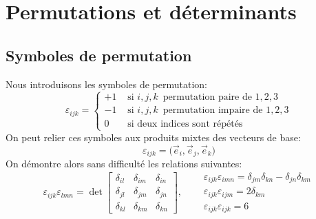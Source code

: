 \section{Permutations et déterminants}
\subsection{Symboles de permutation}
Nous introduisons les symboles de permutation:
\begin{equation}
    \varepsilon_{ijk} = 
    \begin{cases}
        +1 & \text{ si } i, j, k\, \text{ permutation paire de } 1, 2, 3\\
        -1 & \text{ si } i, j, k\, \text{ permutation impaire de } 1, 2, 3\\
        0 & \text{ si deux indices sont répétés}
    \end{cases}
    \label{eq:AnnA-033}
\end{equation}
On peut relier ces symboles aux produits mixtes des vecteurs de base:
\begin{equation}
    \varepsilon_{ijk} = \bigl( \vec{e}_i, \vec{e}_j, \vec{e}_k \bigr)
    \label{eq:AnnA-034}
\end{equation}
On démontre alors sans difficulté les relations suivantes:
\begin{equation}
        \varepsilon_{ijk} \varepsilon_{lmn} = \det
            \begin{bmatrix}
                \delta_{il} & \delta_{im} & \delta_{in} \\
                \delta_{jl} & \delta_{jm} & \delta_{jn} \\
                \delta_{kl} & \delta_{km} & \delta_{kn}
            \end{bmatrix},\quad
 \begin{aligned}
            &\varepsilon_{ijk} \varepsilon_{imn} = \delta_{jm} \delta_{kn} - \delta_{jn} \delta_{km} \\
            &\varepsilon_{ijk} \varepsilon_{ijm} =2 \delta_{km} \\
            &\varepsilon_{ijk} \varepsilon_{ijk} = 6     
\end{aligned}
    \label{eq:AnnA-035}
\end{equation}
